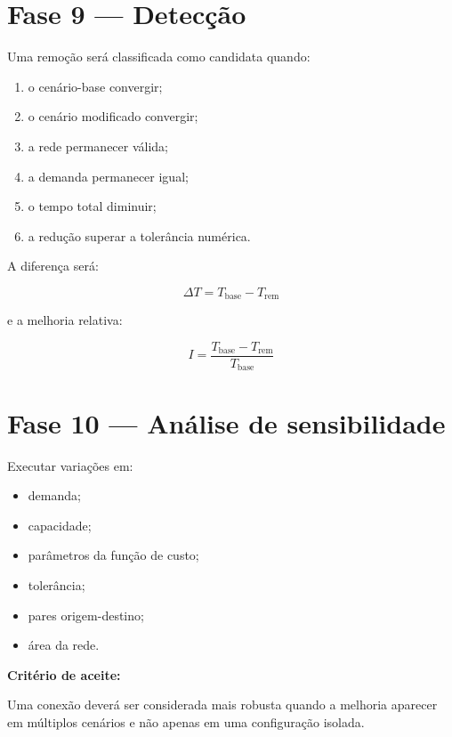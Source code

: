 \documentclass[12pt,a4paper]{article}
\begin{document}
\section{Fase 9 --- Detecção}

Uma remoção será classificada como candidata quando:

\begin{enumerate}
    \item o cenário-base convergir;
    \item o cenário modificado convergir;
    \item a rede permanecer válida;
    \item a demanda permanecer igual;
    \item o tempo total diminuir;
    \item a redução superar a tolerância numérica.
\end{enumerate}

A diferença será:

\begin{equation}
    \Delta T
    =
    T_{\mathrm{base}}
    -
    T_{\mathrm{rem}}
\end{equation}

e a melhoria relativa:

\begin{equation}
    I
    =
    \frac{
        T_{\mathrm{base}}
        -
        T_{\mathrm{rem}}
    }{
        T_{\mathrm{base}}
    }
\end{equation}

\section{Fase 10 --- Análise de sensibilidade}

Executar variações em:

\begin{itemize}
    \item demanda;
    \item capacidade;
    \item parâmetros da função de custo;
    \item tolerância;
    \item pares origem-destino;
    \item área da rede.
\end{itemize}

\textbf{Critério de aceite:}

Uma conexão deverá ser considerada mais robusta quando a melhoria aparecer
em múltiplos cenários e não apenas em uma configuração isolada.
\end{document}
